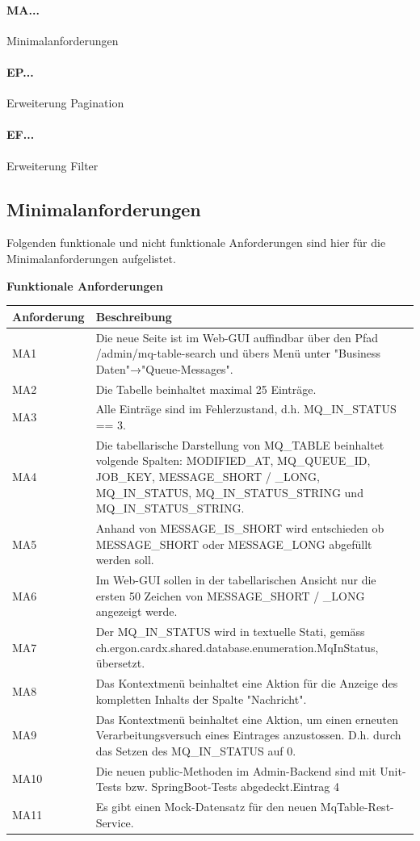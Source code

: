 \paragraph{MA...} Minimalanforderungen
\paragraph{EP...} Erweiterung Pagination
\paragraph{EF...} Erweiterung Filter

\subsection{Minimalanforderungen}
Folgenden funktionale und nicht funktionale Anforderungen sind hier für die Minimalanforderungen aufgelistet.

\textbf{Funktionale Anforderungen}\newline

\noindent \begin{tabular}{|p{3cm}|p{12cm}|}
	\hline
	\textbf{Anforderung}  & \textbf{Beschreibung} \\ \hline
	MA1    & Die neue Seite ist im Web-GUI auffindbar über den Pfad /admin/mq-table-search und übers Menü unter "Business Daten"→"Queue-Messages".     \\ \hline
	MA2    & Die Tabelle beinhaltet maximal 25 Einträge.     \\ \hline
	MA3    & Alle Einträge sind im Fehlerzustand, d.h. MQ\_IN\_STATUS == 3.     \\ \hline
	MA4    & Die tabellarische Darstellung von MQ\_TABLE beinhaltet volgende Spalten: MODIFIED\_AT, MQ\_QUEUE\_ID, JOB\_KEY, MESSAGE\_SHORT / \_LONG, MQ\_IN\_STATUS, MQ\_IN\_STATUS\_STRING und MQ\_IN\_STATUS\_STRING.    \\ \hline
	MA5    & Anhand von MESSAGE\_IS\_SHORT wird entschieden ob MESSAGE\_SHORT oder MESSAGE\_LONG abgefüllt werden soll.     \\ \hline
	MA6    & Im Web-GUI sollen in der tabellarischen Ansicht nur die ersten 50 Zeichen von MESSAGE\_SHORT / \_LONG angezeigt werde.     \\ \hline
	MA7    & Der MQ\_IN\_STATUS wird in textuelle Stati, gemäss ch.ergon.cardx.shared.database.enumeration.MqInStatus, übersetzt.      \\ \hline
	MA8    & Das Kontextmenü beinhaltet eine Aktion für die Anzeige des kompletten Inhalts der Spalte "Nachricht".     \\ \hline
	MA9    & Das Kontextmenü beinhaltet eine Aktion, um einen erneuten Verarbeitungsversuch eines Eintrages anzustossen. D.h. durch das Setzen des MQ\_IN\_STATUS auf 0.     \\ \hline
	MA10    & Die neuen public-Methoden im Admin-Backend sind mit Unit-Tests bzw. SpringBoot-Tests abgedeckt.Eintrag 4     \\ \hline
	MA11    & Es gibt einen Mock-Datensatz für den neuen MqTable-Rest-Service.     \\ \hline
\end{tabular}

